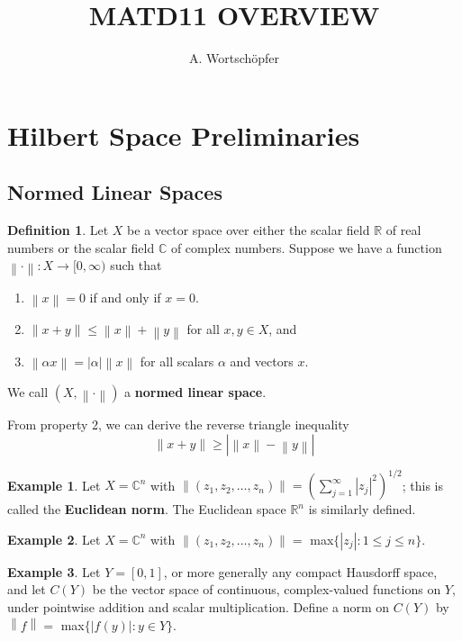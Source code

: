 \documentclass{article}
\title{MATD11 OVERVIEW}
\author{A. Wortschöpfer}
\theoremstyle{definition}
\newtheorem{example}{Example}
\newtheorem*{defn}{Definition}
\newcommand{\norm}[1]{\left\lVert#1\right\rVert}
\begin{document}
    \maketitle

    \section{Hilbert Space Preliminaries}

    \subsection{Normed Linear Spaces}

    \begin{defn}
        Let $X$ be a vector space over either the scalar field $\mathbb{R}$ of real numbers or the scalar field $\mathbb{C}$ of
        complex numbers. Suppose we have a function $\norm{\cdot}:X\to[0,\infty)$ such that
        \begin{enumerate}
            \item $\norm{x} = 0$ if and only if $x=0$.
            \item $\norm{x+y} \leq \norm{x}+\norm{y}$ for all $x,y\in X$, and
            \item $\norm{\alpha x} = |\alpha|\norm{x}$ for all scalars $\alpha$ and vectors $x$.
        \end{enumerate}
        We call $(X,\norm{\cdot})$ a \textbf{normed linear space}.
    \end{defn}

    From property 2, we can derive the reverse triangle inequality
    \[ \norm{x+y}\geq |\norm{x}-\norm{y}| \]

    \begin{example}
        Let $X = \mathbb{C}^n$ with $\norm{(z_1,z_2,\hdots,z_n)} = (\sum_{j=1}^{\infty} |z_j|^2)^{1/2}$; this is called the
        \textbf{Euclidean norm}. The Euclidean space $\mathbb{R}^n$ is similarly defined.
    \end{example}

    \begin{example}
        Let $X=\mathbb{C}^n$ with $\norm{(z_1,z_2,\hdots,z_n)} =$ max$\{|z_j|:1\leq j\leq n\}$.
    \end{example}

    \begin{example}
        Let $Y=[0,1]$, or more generally any compact Hausdorff space, and let $C(Y)$ be the vector space of continuous, complex-valued
        functions on $Y$, under pointwise addition and scalar multiplication. Define a norm on $C(Y)$ by
        $\norm{f} =$ max$\{|f(y)|:y\in Y\}$.
    \end{example}
\end{document}
